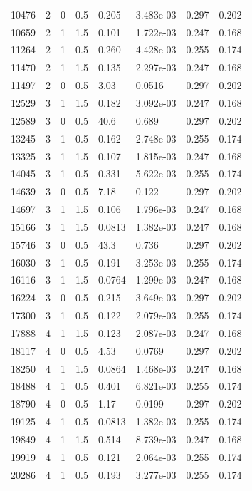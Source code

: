 \documentclass[preview]{standalone}
\begin{document}
{{\begin{tabular}{L{1.2cm}C{1.2cm} C{0.3cm}C{0.5cm} C{1.4cm}C{1.4cm} C{1.4cm}C{1.4cm}}
  10476  &     2  & 0     & 0.5 &  0.205  & 3.483e-03  & 0.297 &  0.202   \\ 
  10659  &     2  & 1     & 1.5 &  0.101  & 1.722e-03  & 0.247 &  0.168   \\ 
  11264  &     2  & 1     & 0.5 &  0.260  & 4.428e-03  & 0.255 &  0.174   \\ 
  11470  &     2  & 1     & 1.5 &  0.135  & 2.297e-03  & 0.247 &  0.168   \\ 
  11497  &     2  & 0     & 0.5 &  3.03  & 0.0516  & 0.297 &  0.202   \\ 
  12529  &     3  & 1     & 1.5 &  0.182  & 3.092e-03  & 0.247 &  0.168   \\ 
  12589  &     3  & 0     & 0.5 &  40.6  & 0.689  & 0.297 &  0.202   \\ 
  13245  &     3  & 1     & 0.5 &  0.162  & 2.748e-03  & 0.255 &  0.174   \\ 
  13325  &     3  & 1     & 1.5 &  0.107  & 1.815e-03  & 0.247 &  0.168   \\ 
  14045  &     3  & 1     & 0.5 &  0.331  & 5.622e-03  & 0.255 &  0.174   \\ 
  14639  &     3  & 0     & 0.5 &  7.18  & 0.122  & 0.297 &  0.202   \\ 
  14697  &     3  & 1     & 1.5 &  0.106  & 1.796e-03  & 0.247 &  0.168   \\ 
  15166  &     3  & 1     & 1.5 &  0.0813  & 1.382e-03  & 0.247 &  0.168   \\ 
  15746  &     3  & 0     & 0.5 &  43.3  & 0.736  & 0.297 &  0.202   \\ 
  16030  &     3  & 1     & 0.5 &  0.191  & 3.253e-03  & 0.255 &  0.174   \\ 
  16116  &     3  & 1     & 1.5 &  0.0764  & 1.299e-03  & 0.247 &  0.168   \\ 
  16224  &     3  & 0     & 0.5 &  0.215  & 3.649e-03  & 0.297 &  0.202   \\ 
  17300  &     3  & 1     & 0.5 &  0.122  & 2.079e-03  & 0.255 &  0.174   \\ 
  17888  &     4  & 1     & 1.5 &  0.123  & 2.087e-03  & 0.247 &  0.168   \\ 
  18117  &     4  & 0     & 0.5 &  4.53  & 0.0769  & 0.297 &  0.202   \\ 
  18250  &     4  & 1     & 1.5 &  0.0864  & 1.468e-03  & 0.247 &  0.168   \\ 
  18488  &     4  & 1     & 0.5 &  0.401  & 6.821e-03  & 0.255 &  0.174   \\ 
  18790  &     4  & 0     & 0.5 &  1.17  & 0.0199  & 0.297 &  0.202   \\ 
  19125  &     4  & 1     & 0.5 &  0.0813  & 1.382e-03  & 0.255 &  0.174   \\ 
  19849  &     4  & 1     & 1.5 &  0.514  & 8.739e-03  & 0.247 &  0.168   \\ 
  19919  &     4  & 1     & 0.5 &  0.121  & 2.064e-03  & 0.255 &  0.174   \\ 
  20286  &     4  & 1     & 0.5 &  0.193  & 3.277e-03  & 0.255 &  0.174   \\ 
\hline 
\end{tabular} 

}}
\end{document}
